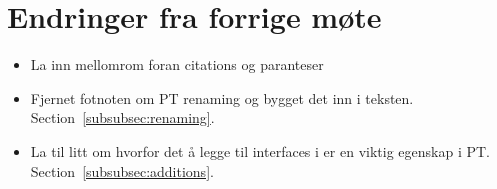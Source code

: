 
\chapter*{Endringer fra forrige møte}

\begin{itemize}
    \item La inn mellomrom foran citations og paranteser
    \item Fjernet fotnoten om PT renaming og bygget det inn i teksten.
    Section~\vref{subsubsec:renaming}.
    \item La til litt om hvorfor det å legge til interfaces i  er en viktig egenskap i PT.
    Section~\vref{subsubsec:additions}.
\end{itemize}

